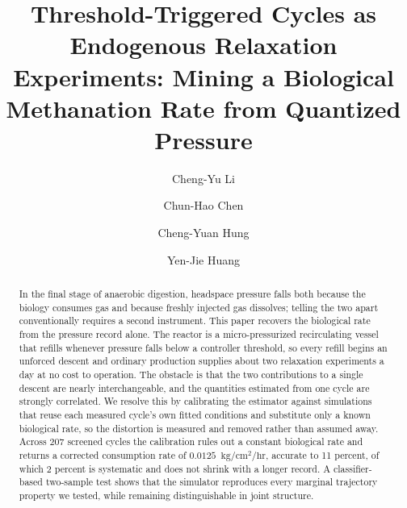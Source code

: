 \documentclass[sigconf]{acmart}
\newcommand{\ratu}{\ensuremath{\mathrm{kg/cm^{2}/hr}}}
\begin{document}
\title{Threshold-Triggered Cycles as Endogenous Relaxation
Experiments: Mining a Biological Methanation Rate from Quantized
Pressure}

\author{Cheng-Yu Li}

\author{Chun-Hao Chen}

\author{Cheng-Yuan Hung}

\author{Yen-Jie Huang}

\begin{abstract}
In the final stage of anaerobic digestion, headspace pressure falls
both because the biology consumes gas and because freshly injected gas
dissolves; telling the two apart conventionally requires a second
instrument. This paper recovers the biological rate from the pressure
record alone. The reactor is a micro-pressurized recirculating vessel
that refills whenever pressure falls below a controller threshold, so
every refill begins an unforced descent and ordinary production
supplies about two relaxation experiments a day at no cost to
operation. The obstacle is that the two contributions to a single
descent are nearly interchangeable, and the quantities estimated from
one cycle are strongly correlated. We resolve this by calibrating the estimator against
simulations that reuse each measured cycle's own fitted conditions and
substitute only a known biological rate, so the distortion is measured
and removed rather than assumed away. Across 207 screened
cycles the calibration rules out a constant biological rate and returns
a corrected consumption rate of $0.0125$~\ratu{},
accurate to 11 percent, of which 2 percent is systematic and does
not shrink with a longer record. A classifier-based two-sample test
shows that the simulator reproduces every marginal trajectory property
we tested, while remaining distinguishable in joint structure.

\end{abstract}
\end{document}
